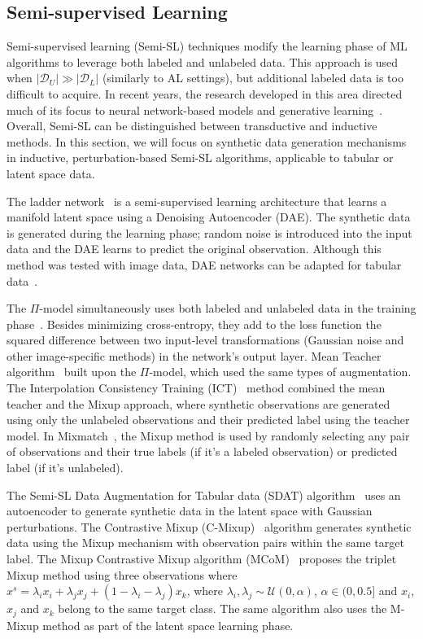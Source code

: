 \subsection{Semi-supervised Learning}\label{sec:semi-supervised-learning}

Semi-supervised learning (Semi-SL) techniques modify the learning phase of ML
algorithms to leverage both labeled and unlabeled data. This approach is used
when $|\mathcal{D}_U| \gg |\mathcal{D}_L|$ (similarly to AL settings), but
additional labeled data is too difficult to acquire. In recent years,
the research developed in this area directed much of its focus to neural
network-based models and generative learning~\cite{Van2020}. Overall,
Semi-SL can be distinguished between transductive and inductive methods. In
this section, we will focus on synthetic data generation mechanisms in
inductive, perturbation-based Semi-SL algorithms, applicable to tabular or
latent space data.

The ladder network~\cite{rasmus2015semi} is a semi-supervised learning
architecture that learns a manifold latent space using a Denoising
Autoencoder (DAE). The synthetic data is generated during the learning phase;
random noise is introduced into the input data and the DAE learns to predict
the original observation. Although this method was tested with image data,
DAE networks can be adapted for tabular data~\cite{sattarov2022explaining}.

The $\Pi$-model simultaneously uses both labeled and unlabeled data in the
training phase~\cite{samuli2017temporal}. Besides minimizing cross-entropy,
they add to the loss function the squared difference between two input-level
transformations (Gaussian noise and other image-specific methods) in the
network's output layer. Mean Teacher algorithm~\cite{tarvainen2017mean} built
upon the $\Pi$-model, which used the same types of augmentation. The
Interpolation Consistency Training (ICT)~\cite{verma2022interpolation} method
combined the mean teacher and the Mixup approach, where synthetic observations
are generated using only the unlabeled observations and their predicted label
using the teacher model. In Mixmatch~\cite{berthelot2019mixmatch}, the Mixup
method is used by randomly selecting any pair of observations and their true
labels (if it's a labeled observation) or predicted label (if it's unlabeled).

The Semi-SL Data Augmentation for Tabular data (SDAT)
algorithm~\cite{fang2022semi} uses an autoencoder to generate synthetic data
in the latent space with Gaussian perturbations. The Contrastive Mixup
(C-Mixup)~\cite{darabi2021contrastive} algorithm generates synthetic data
using the Mixup mechanism with observation pairs within the same target label.
The Mixup Contrastive Mixup algorithm (MCoM)~\cite{li2022mcom} proposes the
triplet Mixup method using three observations where $x^s = \lambda_ix_i +
\lambda_jx_j + (1-\lambda_i-\lambda_j)x_k$, where $\lambda_i, \lambda_j \sim
\mathcal{U}(0, \alpha)$, $\alpha \in (0, 0.5]$ and $x_i$, $x_j$ and $x_k$
belong to the same target class. The same algorithm also uses the M-Mixup
method as part of the latent space learning phase.


